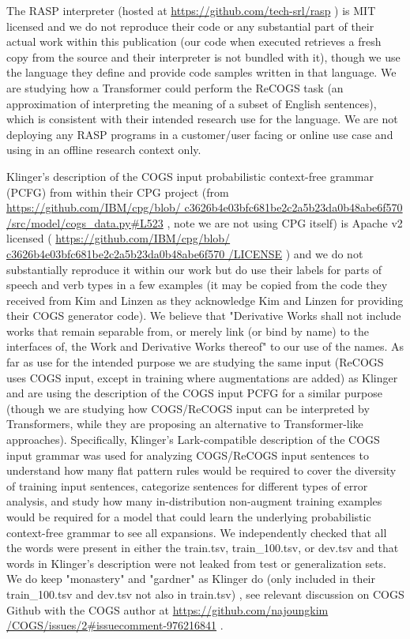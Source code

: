 \documentclass[11pt]{article}
\begin{document}
The RASP \citep{Weiss2021} interpreter (hosted at \href{https://github.com/tech-srl/rasp}{https://github.com/tech-srl/rasp} ) is MIT licensed and we do not reproduce their code or any substantial part of their actual work within this publication (our code when executed retrieves a fresh copy from the source and their interpreter is not bundled with it), though we use the language they define and provide code samples written in that language. We are studying how a Transformer could perform the ReCOGS task (an approximation of interpreting the meaning of a subset of English sentences), which is consistent with their intended research use for the language. We are not deploying any RASP programs in a customer/user facing or online use case and using in an offline research context only.
 
Klinger's description of the COGS input probabilistic context-free grammar (PCFG) from within their CPG project (from \href{https://github.com/IBM/cpg/blob/c3626b4e03bfc681be2c2a5b23da0b48abe6f570/src/model/cogs\_data.py\#L523}{https://github.com/IBM/cpg/blob/
c3626b4e03bfc681be2c2a5b23da0b48abe6f570
/src/model/cogs\_data.py\#L523} , note we are not using CPG itself) is Apache v2 licensed ( \href{https://github.com/IBM/cpg/blob/c3626b4e03bfc681be2c2a5b23da0b48abe6f570/LICENSE}{https://github.com/IBM/cpg/blob/
c3626b4e03bfc681be2c2a5b23da0b48abe6f570
/LICENSE} ) and we do not substantially reproduce it within our work but do use their labels for parts of speech and verb types in a few examples (it may be copied from the code they received from Kim and Linzen as they acknowledge Kim and Linzen for providing their COGS generator code). We believe that "Derivative Works shall not include works that remain separable from, or merely link (or bind by name) to the interfaces of, the Work and Derivative Works thereof" to our use of the names. As far as use for the intended purpose we are studying the same input (ReCOGS uses COGS input, except in training where augmentations are added) as Klinger and are using the description of the COGS input PCFG for a similar purpose (though we are studying how COGS/ReCOGS input can be interpreted by Transformers, while they are proposing an alternative to Transformer-like approaches). Specifically, Klinger's Lark-compatible description of the COGS input grammar was used for analyzing COGS/ReCOGS input sentences to understand how many flat pattern rules would be required to cover the diversity of training input sentences, categorize sentences for different types of error analysis, and study how many in-distribution non-augment training examples would be required for a model that could learn the underlying probabilistic context-free grammar to see all expansions. We independently checked that all the words were present in either the train.tsv, train\_100.tsv, or dev.tsv and that words in Klinger's description were not leaked from test or generalization sets. We do keep "monastery" and "gardner" as Klinger do (only included in their train\_100.tsv and dev.tsv not also in train.tsv) , see relevant discussion on COGS Github with the COGS author at \href{https://github.com/najoungkim/COGS/issues/2\#issuecomment-976216841}{https://github.com/najoungkim
/COGS/issues/2\#issuecomment-976216841} .
\end{document}
